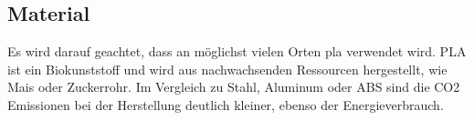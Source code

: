 



\subsection{Material}

Es wird darauf geachtet, dass an möglichst vielen Orten \acrfull{pla} verwendet wird. PLA ist ein Biokunststoff und wird aus nachwachsenden Ressourcen hergestellt, wie Mais oder Zuckerrohr.\cite{pla} Im Vergleich zu Stahl, Aluminum oder ABS sind die CO2 Emissionen bei der Herstellung deutlich kleiner, ebenso der Energieverbrauch.


